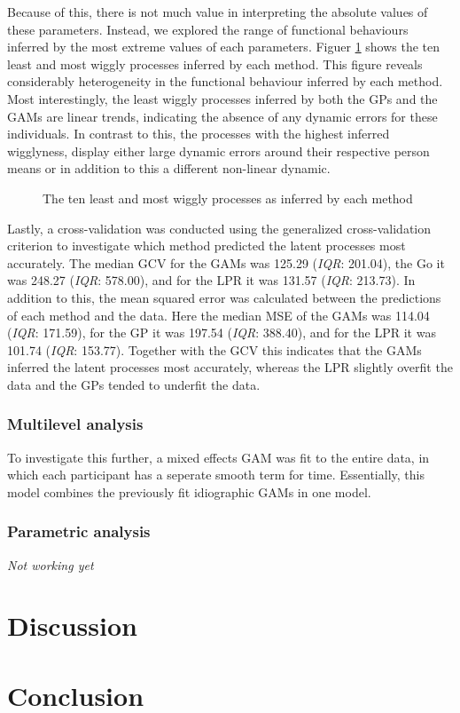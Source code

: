 \documentclass[man, floatsintext]{apa7}
\begin{document}
Because of this, there is not much value in interpreting the absolute values
of these parameters. Instead, we explored the range of functional behaviours
inferred by the most extreme values of each parameters. Figuer
\ref{fig:dem_smooth} shows
the ten least and most wiggly processes inferred by each method. This figure
reveals considerably heterogeneity in the functional behaviour inferred by
each method. Most interestingly, the least wiggly processes inferred by both
the GPs and the GAMs are linear trends, indicating the absence of any
dynamic errors for these individuals. In contrast to this, the processes
with the highest inferred wigglyness, display either large dynamic errors
around their respective person means or in addition to this a different
non-linear dynamic.

\begin{figure}[!ht]
  \caption{The ten least and most wiggly processes as inferred by each method}
  \label{fig:dem_smooth}
\end{figure}

Lastly, a cross-validation was conducted using the generalized cross-validation
criterion to investigate which method predicted the latent processes most
accurately. The median GCV for the GAMs was 125.29 (\textit{IQR}: 201.04),
the Go it was 248.27 (\textit{IQR}: 578.00), and for the LPR it was
131.57 (\textit{IQR}: 213.73). In addition to this, the mean squared error
was calculated between the predictions of each method and the data.
Here the median MSE of the GAMs was 114.04 (\textit{IQR}: 171.59),
for the GP it was 197.54 (\textit{IQR}: 388.40), and for the LPR it was
101.74 (\textit{IQR}: 153.77). Together with the GCV this indicates that
the GAMs inferred the latent processes most accurately, whereas the LPR
slightly overfit the data and the GPs tended to underfit the data.

\subsubsection{Multilevel analysis}

To investigate this further, a mixed effects GAM was fit to the entire data,
in which each participant has a seperate smooth term for time. Essentially,
this model combines the previously fit idiographic GAMs in one model.

\subsubsection{Parametric analysis}

\textit{Not working yet}

\section{Discussion}

\section{Conclusion}

\printbibliography[]
\end{document}
